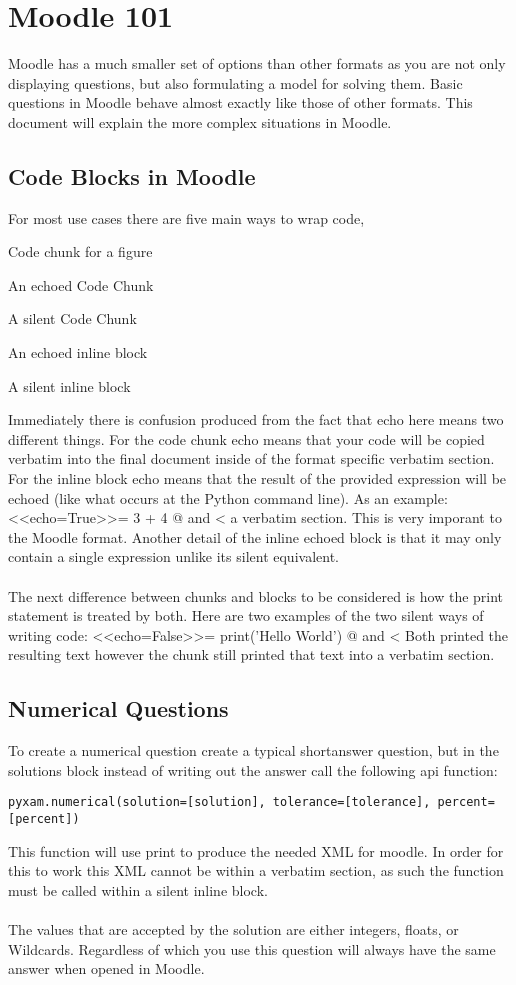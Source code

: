 \documentclass[12pt]{exam}
\begin{document}
\section*{Moodle 101}
Moodle has a much smaller set of options than other formats as you are not only displaying questions, but also
formulating a model for solving them. Basic questions in Moodle behave almost exactly like those of other formats. This
document will explain the more complex situations in Moodle.
\subsection*{Code Blocks in Moodle}
For most use cases there are five main ways to wrap code,
\begin{description}
\item Code chunk for a figure
\item An echoed Code Chunk
\item A silent Code Chunk
\item An echoed inline block
\item A silent inline block
\end{description}
Immediately there is confusion produced from the fact that echo here means two different things. For the code chunk
echo means that your code will be copied verbatim into the final document inside of the format specific verbatim
section. For the inline block echo means that the result of the provided expression will be echoed (like what occurs
at the Python command line). As an example:
<<echo=True>>=
3 + 4
@
and <%
a verbatim section. This is very imporant to the Moodle format. Another detail of the inline echoed block is that it may
only contain a single expression unlike its silent equivalent.
\\\\
The next difference between chunks and blocks to be considered is how the print statement is treated by both. Here are
two examples of the two silent ways of writing code:
<<echo=False>>=
print('Hello World')
@
and <%
Both printed the resulting text however the chunk still printed that text into a verbatim section.
\subsection*{Numerical Questions}
To create a numerical question create a typical shortanswer question, but in the solutions block instead of writing
out the answer call the following api function:
\begin{verbatim}
pyxam.numerical(solution=[solution], tolerance=[tolerance], percent=[percent])
\end{verbatim}
This function will use print to produce the needed XML for moodle. In order for this to work this XML cannot be
within a verbatim section, as such the function must be called within a silent inline block.
\\\\
The values that are accepted by the solution are either integers, floats, or Wildcards. Regardless of which you use this
question will always have the same answer when opened in Moodle.
\end{document}
